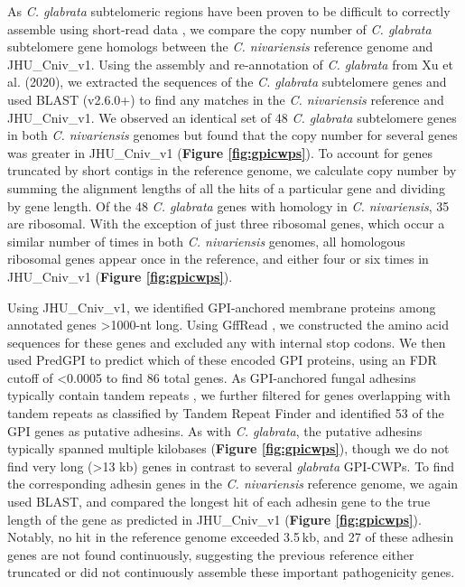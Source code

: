 As \textit{C. glabrata} subtelomeric regions have been proven to be difficult to correctly assemble using short-read data \citep{Xu2020-ta}, we compare the copy number of \textit{C. glabrata} subtelomere gene homologs between the \textit{C. nivariensis} reference genome and JHU\_Cniv\_v1. Using the assembly and re-annotation of \textit{C. glabrata} from Xu et al. (2020), we extracted the sequences of the \textit{C. glabrata} subtelomere genes and used BLAST (v2.6.0+) to find any matches in the \textit{C. nivariensis} reference and JHU\_Cniv\_v1. We observed an identical set of 48 \textit{C. glabrata} subtelomere genes in both \textit{C. nivariensis} genomes but found that the copy number for several genes was greater in JHU\_Cniv\_v1 ({\bf Figure \ref{fig:gpicwps}}). To account for genes truncated by short contigs in the reference genome, we calculate copy number by summing the alignment lengths of all the hits of a particular gene and dividing by gene length. Of the 48 \textit{C. glabrata} genes with homology in \textit{C. nivariensis}, 35 are ribosomal. With the exception of just three ribosomal genes, which occur a similar number of times in both \textit{C. nivariensis} genomes, all homologous ribosomal genes appear once in the reference, and either four or six times in JHU\_Cniv\_v1 ({\bf Figure \ref{fig:gpicwps}}).

Using JHU\_Cniv\_v1, we identified GPI-anchored membrane proteins among annotated genes >1000-nt long. Using GffRead \citep{Pertea2020-lw}, we constructed the amino acid sequences for these genes and excluded any with internal stop codons. We then used PredGPI \citep{Pierleoni2008-aw} to predict which of these encoded GPI proteins, using an FDR cutoff of <0.0005 \citep{Xu2020-ta} to find 86 total genes. As GPI-anchored fungal adhesins typically contain tandem repeats \citep{Lipke2018-ow, Xu2020-ta}, we further filtered for genes overlapping with tandem repeats as classified by Tandem Repeat Finder and identified 53 of the GPI genes as putative adhesins. As with \textit{C. glabrata}, the putative adhesins typically spanned multiple kilobases ({\bf Figure \ref{fig:gpicwps}}), though we do not find very long (>13 kb) genes in contrast to several \textit{glabrata} GPI-CWPs. To find the corresponding adhesin genes in the \textit{C. nivariensis} reference genome, we again used BLAST, and compared the longest hit of each adhesin gene to the true length of the gene as predicted in JHU\_Cniv\_v1 ({\bf Figure \ref{fig:gpicwps}}). Notably, no hit in the reference genome exceeded 3.5 kb, and 27 of these adhesin genes are not found continuously, suggesting the previous reference either truncated or did not continuously assemble these important pathogenicity genes.


